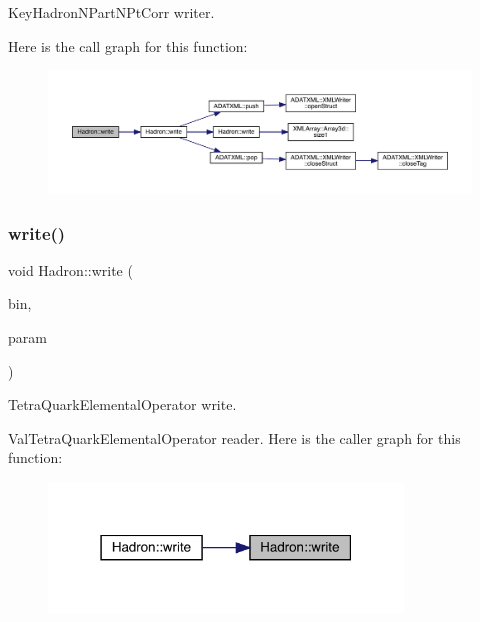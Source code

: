 Key\+Hadron\+N\+Part\+N\+Pt\+Corr writer. 

Here is the call graph for this function\+:\nopagebreak
\begin{figure}[H]
\begin{center}
\leavevmode
\includegraphics[width=350pt]{d1/daf/namespaceHadron_aef02c5c2c485a766d9e66d0dabe73f62_cgraph}
\end{center}
\end{figure}
\mbox{\label{namespaceHadron_ac78ff88ef705b3eaa48d7d440fe2a299}} 
\subsubsection{\texorpdfstring{write()}{write()}\hspace{0.1cm}{\footnotesize\ttfamily [54/95]}}
{\footnotesize\ttfamily void Hadron\+::write (\begin{DoxyParamCaption}\item[{\mbox{\hyperlink{classADATIO_1_1BinaryWriter}{Binary\+Writer}} \&}]{bin,  }\item[{const \mbox{\hyperlink{structHadron_1_1ValTetraQuarkElementalOperator__t}{Val\+Tetra\+Quark\+Elemental\+Operator\+\_\+t}} \&}]{param }\end{DoxyParamCaption})}



Tetra\+Quark\+Elemental\+Operator write. 

Val\+Tetra\+Quark\+Elemental\+Operator reader. Here is the caller graph for this function\+:\nopagebreak
\begin{figure}[H]
\begin{center}
\leavevmode
\includegraphics[width=267pt]{d1/daf/namespaceHadron_ac78ff88ef705b3eaa48d7d440fe2a299_icgraph}
\end{center}
\end{figure}
\mbox{\label{namespaceHadron_a767bdf4c228c06edad1c47918ec75ed3}} 
